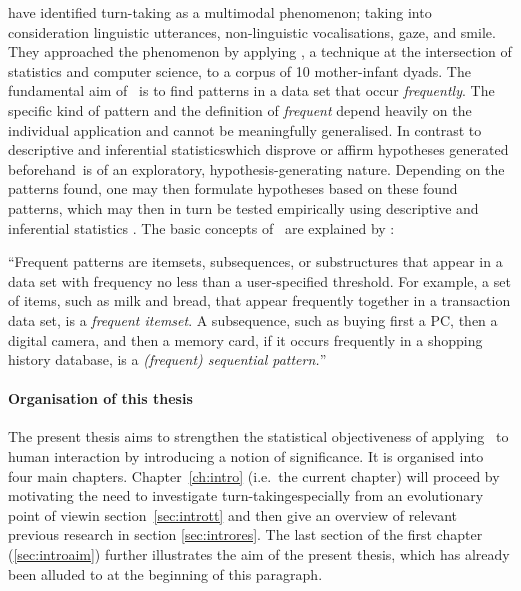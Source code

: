 \citet{rohlfing_multimodal_underreview} have identified turn-taking as a multimodal phenomenon; taking into consideration linguistic utterances, non-linguistic vocalisations, gaze, and smile.
They approached the phenomenon by applying \fpmlower, a technique at the intersection of statistics and computer science, to a corpus of 10 mother-infant dyads.
The fundamental aim of \fpmlower\ is to find patterns in a data set that occur \emph{frequently}.
The specific kind of pattern and the definition of \emph{frequent} depend heavily on the individual application and cannot be meaningfully generalised.
In contrast to descriptive and inferential statistics\dash which disprove or affirm hypotheses generated beforehand\dash \fpmlower\ is of an exploratory, hypothesis-generating nature.
Depending on the patterns found, one may then formulate hypotheses based on these found patterns, which may then in turn be tested empirically using descriptive and inferential statistics \cite[]{rohlfing_multimodal_underreview,han_data_2012}.
The basic concepts of \fpmlower\ are explained by \citet[, emphasis in original]{han_frequent_2007}:
\begin{customquote}
``Frequent patterns are itemsets, subsequences, or substructures that appear in a data set with frequency no less than a user-specified threshold.
For example, a set of items, such as milk and bread, that appear frequently together in a transaction data set, is a \emph{frequent itemset}.
A subsequence, such as buying first a PC, then a digital camera, and then a memory card, if it occurs frequently in a shopping history database, is a \emph{(frequent) sequential pattern.}''
\end{customquote}

\paragraph{Organisation of this thesis}
The present thesis aims to strengthen the statistical objectiveness of applying \fpmlower\ to human interaction by introducing a notion of significance.
It is organised into four main chapters.
Chapter~\ref{ch:intro} (i.e.\ the current chapter) will proceed by motivating the need to investigate turn-taking\dash especially from an evolutionary point of view\dash in section~\ref{sec:intrott} and then give an overview of relevant previous research in section \ref{sec:introres}.
The last section of the first chapter (\ref{sec:introaim}) further illustrates the aim of the present thesis, which has already been alluded to at the beginning of this paragraph.


